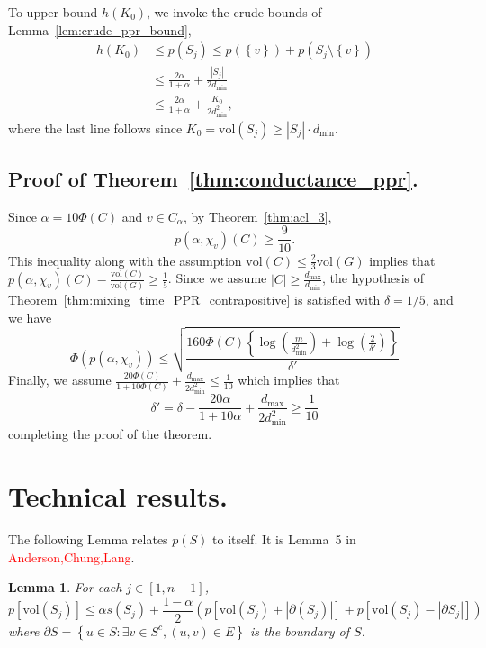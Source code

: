 \documentclass{article}
\newcommand{\abs}[1]{\left \lvert #1 \right \rvert}
\newcommand{\vol}{\mathrm{vol}}
\newcommand{\set}[1]{\left\{#1\right\}}
\newcommand{\1}{\mathbf{1}}
\theoremstyle{alden}
\theoremstyle{aldenthm}
\newtheorem{lemma}{Lemma}
\theoremstyle{remark}
\begin{document}
To upper bound $h(K_0)$, we invoke the crude bounds of Lemma~\ref{lem:crude_ppr_bound},
\begin{align*}
h(K_0) & \leq p(S_j) \leq p(\set{v}) + p(S_j \setminus \set{v}) \\
& \leq \frac{2\alpha}{1 + \alpha} + \frac{\abs{S_j}}{2d_{\min}} \\
& \leq \frac{2\alpha}{1 + \alpha} + \frac{K_0}{2d_{\min}^2},
\end{align*}
where the last line follows since $K_0 = \vol(S_j) \geq \abs{S_j}\cdot d_{\min}$.

\subsection{Proof of Theorem~\ref{thm:conductance_ppr}.}
Since $\alpha = 10\Phi(C)$ and $v \in C_{\alpha}$, by Theorem~\ref{thm:acl_3},
\begin{equation*}
p(\alpha,\chi_v)(C) \geq \frac{9}{10}.
\end{equation*}
This inequality along with the assumption $\vol(C) \leq \frac{2}{3}\vol(G)$ implies that $p(\alpha,\chi_v)(C) - \frac{\vol(C)}{\vol(G)} \geq \frac{1}{5}$. Since we assume $\abs{C} \geq \frac{d_{\max}}{d_{\min}}$, the hypothesis of Theorem~\ref{thm:mixing_time_PPR_contrapositive} is satisfied with $\delta = 1/5$, and we have
\begin{equation*}
\Phi(p(\alpha,\chi_v)) \leq \sqrt{\frac{160\Phi(C)\left\{\log\left(\frac{m}{d_{\min}^2}\right) + \log\left(\frac{2}{\delta'}\right)\right\}}{\delta'}}
\end{equation*}
Finally, we assume $\frac{20\Phi(C)}{1 + 10\Phi(C)} + \frac{d_{\max}}{2d_{\min}^2} \leq \frac{1}{10}$ which implies that
\begin{equation*}
\delta' = \delta - \frac{20\alpha}{1 + 10\alpha} + \frac{d_{\max}}{2d_{\min}^2} \geq \frac{1}{10} 
\end{equation*}
completing the proof of the theorem.
\section{Technical results.}

The following Lemma relates $p(S)$ to itself. It is Lemma~5 in \textcolor{red}{Anderson,Chung,Lang}.
\begin{lemma}
	\label{lem:acl_1}
	For each $j \in [1,n-1]$,
	\begin{equation*}
	p[\vol(S_j)] \leq \alpha s(S_j) + \frac{1 - \alpha}{2} \left(p[\vol(S_j) + \abs{\partial(S_j)}] + p[\vol(S_j) - \abs{\partial{S_j}}]  \right)
	\end{equation*}
	where $\partial{S} = \set{u \in S: \exists v \in S^c, (u,v) \in E}$ is the boundary of $S$.
\end{lemma}
\end{document}
